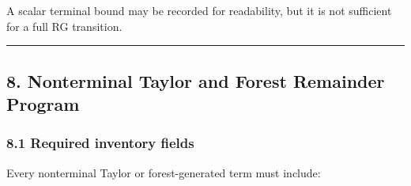 \documentclass[
]{article}
\begin{document}
A scalar terminal bound may be recorded for readability, but it is not
sufficient for a full RG transition.

\begin{center}\rule{0.5\linewidth}{0.5pt}\end{center}

\subsection{8. Nonterminal Taylor and Forest Remainder
Program}\label{nonterminal-taylor-and-forest-remainder-program}

\subsubsection{8.1 Required inventory
fields}\label{required-inventory-fields}

Every nonterminal Taylor or forest-generated term must include:
\end{document}

